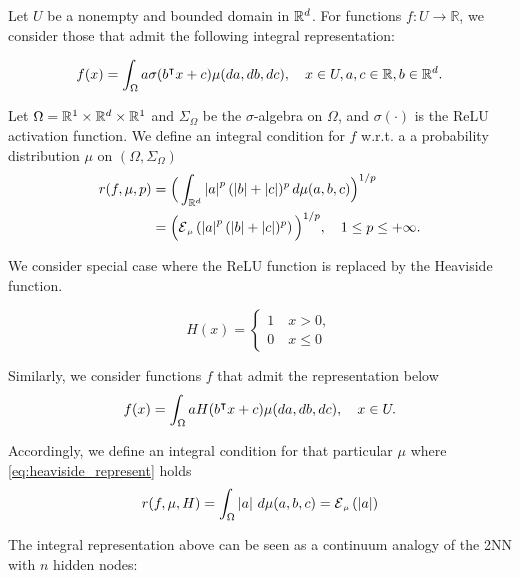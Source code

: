 Let $U$ be a nonempty and bounded domain in $\mathbb{R}^d$. For functions $f: U \to
\mathbb{R}$, we consider those that admit the following integral representation:

\begin{equation}
    \label{eq:barron_represent}
    f(x) = \int_{\Omega} a \sigma(b{}^{\intercal} x + c) \mu(da, db, dc), \quad 
    x \in U, a,c \in \mathbb{R}, b \in \mathbb{R}^d.
\end{equation}

Let $\Omega = \mathbb{R}^1 \times \mathbb{R}^d \times \mathbb{R}^1$ and $\Sigma_{\Omega}$ be the
$\sigma$-algebra on $\Omega$, and $\sigma(\cdot)$ is the ReLU activation
function. We define an integral condition for $f$ w.r.t. a a probability
distribution $\mu$ on $(\Omega, \Sigma_\Omega)$
\begin{align}
    r(f, \mu, p)
    &= \Big(\int_{\R^d} \abs{a}^p  (\abs{b} + \abs{c})^p \,d\mu(a,b,c)\Big)^{1/p} \\
    &= \Big(\ERWi{\mu}{\abs{a}^p  (\abs{b} + \abs{c})^p}\Big)^{1/p},
    \quad 1 \leq p \leq +\infty.
\end{align}

We consider special case where the ReLU function is replaced by the Heaviside
function.

\begin{definition}
    \label{eq:heaviside}
    \begin{equation}
        H(x) = 
        \begin{cases}
            1 \quad x > 0,\\
            0 \quad x \leq 0    
        \end{cases}
    \end{equation}
\end{definition}


Similarly, we consider functions $f$ that admit the representation below
\begin{equation}
    \label{eq:heaviside_represent}
    f(x) = \int_{\Omega} a H(b{}^{\intercal} x + c) \mu(da, db, dc), \quad x \in U.
\end{equation}

Accordingly, we define an integral condition for that particular $\mu$ where
\eqref{eq:heaviside_represent} holds
\begin{align}
    r(f,\mu, H)
    = \int_{\Omega} \abs{a}\,d\mu(a,b,c) = \ERWi{\mu}{\abs{a}}
\end{align}

The integral representation above can be seen as a continuum analogy of the 2NN
with $n$ hidden nodes:

